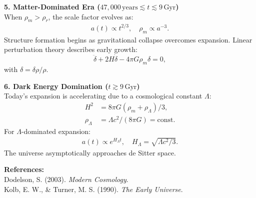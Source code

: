 \begin{technical}
\noindent\textbf{5. Matter-Dominated Era \boldmath(\( 47{,}000 \, \text{years} \lesssim t \lesssim 9\,\text{Gyr} \))}\\[0.3em]
When \(\rho_m > \rho_r\), the scale factor evolves as:
\begin{align}
a(t) \propto t^{2/3}, \quad \rho_m \propto a^{-3}.
\end{align}
Structure formation begins as gravitational collapse overcomes expansion. Linear perturbation theory describes early growth:
\[
\ddot{\delta} + 2 H \dot{\delta} - 4\pi G \rho_m \delta = 0,
\]
with \(\delta = \delta\rho/\rho\).

\noindent\textbf{6. Dark Energy Domination \boldmath(\( t \gtrsim 9\,\text{Gyr} \))}\\[0.3em]
Today's expansion is accelerating due to a cosmological constant \(\Lambda\):
\begin{align}
H^2 &= 8\pi G (\rho_m + \rho_\Lambda)/3, \\
\rho_\Lambda &= \Lambda c^2/(8\pi G) = \text{const.}
\end{align}
For \(\Lambda\)-dominated expansion:
\begin{align}
a(t) \propto e^{H_\Lambda t}, \quad H_\Lambda = \sqrt{\Lambda c^2/3}.
\end{align}
The universe asymptotically approaches de Sitter space.

\vspace{0.3em}
\noindent\textbf{References:}\\
Dodelson, S. (2003). \textit{Modern Cosmology}.\\
Kolb, E. W., \& Turner, M. S. (1990). \textit{The Early Universe}.\\
\end{technical}
